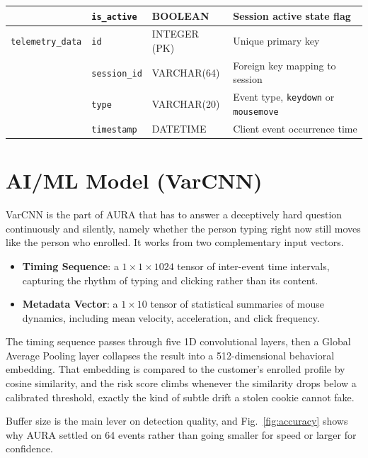 \documentclass[11pt,journal,onecolumn]{article}
\begin{document}
\begin{table}[htbp]
\begin{tabular}{lp{3.3cm}p{2.6cm}p{5.3cm}}
               & \texttt{is\_active} & BOOLEAN & Session active state flag \\
\hline
\texttt{telemetry\_data} & \texttt{id} & INTEGER (PK) & Unique primary key \\
               & \texttt{session\_id} & VARCHAR(64) & Foreign key mapping to session \\
               & \texttt{type} & VARCHAR(20) & Event type, \texttt{keydown} or \texttt{mousemove} \\
               & \texttt{timestamp} & DATETIME & Client event occurrence time \\
\hline
\end{tabular}
\end{table}

\section{AI/ML Model (VarCNN)}
VarCNN is the part of AURA that has to answer a deceptively hard question continuously and silently, namely whether the person typing right now still moves like the person who enrolled. It works from two complementary input vectors.
\begin{itemize}
    \item \textbf{Timing Sequence}: a $1 \times 1 \times 1024$ tensor of inter-event time intervals, capturing the rhythm of typing and clicking rather than its content.
    \item \textbf{Metadata Vector}: a $1 \times 10$ tensor of statistical summaries of mouse dynamics, including mean velocity, acceleration, and click frequency.
\end{itemize}

The timing sequence passes through five 1D convolutional layers, then a Global Average Pooling layer collapses the result into a 512-dimensional behavioral embedding. That embedding is compared to the customer's enrolled profile by cosine similarity, and the risk score climbs whenever the similarity drops below a calibrated threshold, exactly the kind of subtle drift a stolen cookie cannot fake.

Buffer size is the main lever on detection quality, and Fig.~\ref{fig:accuracy} shows why AURA settled on 64 events rather than going smaller for speed or larger for confidence.
\end{document}
